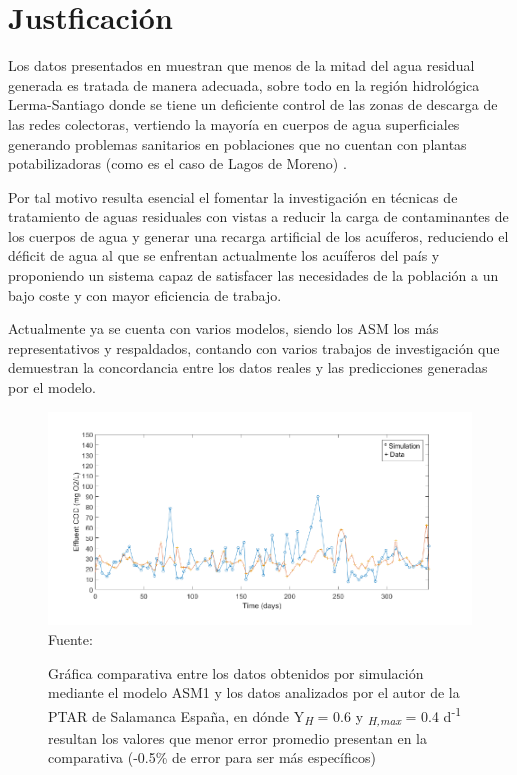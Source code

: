 \section{Justficación}
Los datos presentados en \cite{ODS23} muestran que menos de la mitad del agua residual generada es tratada de manera adecuada, sobre todo en la región hidrológica Lerma-Santiago donde se tiene un deficiente control de las zonas de descarga de las redes colectoras, vertiendo la mayoría en cuerpos de agua superficiales generando problemas sanitarios en poblaciones que no cuentan con plantas potabilizadoras (como es el caso de Lagos de Moreno) \citep{CEAJ2015}.\par
Por tal motivo resulta esencial el fomentar la investigación en técnicas de tratamiento de aguas residuales con vistas a reducir la carga de contaminantes de los cuerpos de agua y generar una recarga artificial de los acuíferos, reduciendo el déficit de agua al que se enfrentan actualmente los acuíferos del país y proponiendo un sistema capaz de satisfacer las necesidades de la población a un bajo coste y con mayor eficiencia de trabajo.\par
Actualmente ya se cuenta con varios modelos, siendo los \gls{ASM} los más representativos y respaldados, contando con varios trabajos de investigación que demuestran la concordancia entre los datos reales y las predicciones generadas por el modelo.\par
\begin{figure}[H]
	\centering
	\includegraphics[scale=.95]{../Images/Costa22_sim.pdf}
	\\\small{Fuente: \cite{Costa2022}}
	\caption{Gráfica comparativa entre los datos obtenidos por simulación mediante el modelo \acrshort{ASM}1 y los datos analizados por el autor de la \acrshort{PTAR} de Salamanca España, en dónde Y\textsubscript{\textit{H}} = 0.6 y \textsubscript{\textit{H,max}} = 0.4 d\textsuperscript{-1} resultan los valores que menor error promedio presentan en la comparativa (-0.5\% de error para ser más específicos)}\label{fig:sim-costa}
\end{figure}
